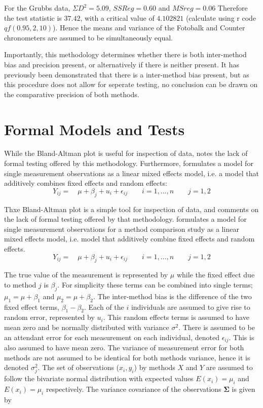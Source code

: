 \documentclass[12pt, a4paper]{report}
\theoremstyle{plain}
\theoremstyle{definition}
\theoremstyle{remark}
\begin{document}
For the Grubbs data, $\Sigma D^{2}=5.09 $, $SSReg = 0.60$ and
$MSreg=0.06$ Therefore the test statistic is $37.42$, with a
critical value of $4.102821$ (calculate using r code
$qf(0.95,2,10)$). Hence the means and variance of the Fotobalk and
Counter chronometers are assumed to be simultaneously equal.

Importantly, this methodology determines whether there is both
inter-method bias and precision present, or alternatively if there
is neither present. It has previously been demonstrated that there
is a inter-method bias present, but as this procedure does not
allow for seperate testing, no conclusion can be drawn on the
comparative precision of both methods.
\newpage


\section{Formal Models and Tests}
	While the Bland-Altman plot is useful for inspection of data, \citet{Kinsella} notes the lack of formal testing offered by
	this methodology. Furthermore, \citet{Kinsella} formulates a model for
	single measurement observations as a
	linear mixed effects model, i.e. a model that additively combines
	fixed effects and random effects:
	\[
	Y_{ij} =\quad \mu + \beta_{j} + u_{i} + \epsilon_{ij} \qquad i = 1,\dots,n
	\qquad j=1,2\]
	
	\bigskip
		Thxe Bland-Altman plot is a simple tool for inspection of data, and
		\citet{Kinsella} comments on the lack of formal testing offered by
		that methodology. \citet{Kinsella} formulates a model for
		single measurement observations for a method comparison study as a
		linear mixed effects model, i.e. model that additively combine
		fixed effects and random effects.
		\[
		Y_{ij} =\quad \mu + \beta_{j} + u_{i} + \epsilon_{ij} \qquad i = 1,\dots,n
		\qquad j=1,2\]
		
	\bigskip
		The true value of the measurement is represented by $\mu$ while the fixed effect due to method $j$ is $\beta_{j}$.
		For simplicity these terms can be combined into single terms; $\mu_{1} = \mu+ \beta_{1}$ and $\mu_{2} = \mu + \beta_{2}$. The inter-method bias is the difference of the two fixed effect terms, $\beta_{1}-\beta_{2}$. Each of the $i$ individuals are assumed to give rise to random error, represented by $u_{i}$. This random effects terms is assumed to have mean zero and be normally distributed with variance $\sigma^2$. There is assumed to be an attendant error for each measurement on each individual, denoted $\epsilon_{ij}$. This is also assumed to have mean zero. The variance of measurement error for both methods are not assumed to be identical for both methods variance,  hence it is denoted $\sigma^2_{j}$. The set of observations ($x_{i},y_{i}$) by methods $X$ and $Y$ are assumed to follow the bivariate normal distribution with expected values $E(x_{i})= \mu_{i}$ and $E(x_{i})= \mu_{i}$ respectively. The variance covariance of the observations $\boldsymbol{\Sigma}$ is given by
		
\end{document}
